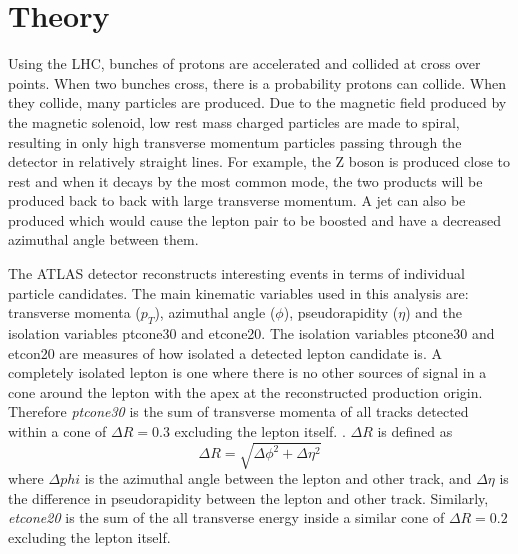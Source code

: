 \documentclass[%
 reprint,
 amsmath,amssymb,
 aps,
]{revtex4-2}
\begin{document}

\section{Theory}
Using the LHC, bunches of protons are accelerated and collided at cross over points. When two bunches cross, there is a probability protons can collide.  When they collide, many particles are produced. Due to the magnetic field produced by the magnetic solenoid, low rest mass charged particles are made to spiral, resulting in only high transverse momentum particles passing through the detector in relatively straight lines.  For example, the Z boson is produced close to rest and when it decays by the most common mode, the two products will be produced back to back with large transverse momentum. A jet can also be produced which would cause the lepton pair to be boosted and have a decreased azimuthal angle between them.

The ATLAS detector reconstructs interesting events in terms of individual particle candidates.  The main kinematic variables used in this analysis are: transverse momenta ($p_T$), azimuthal angle ($\phi$), pseudorapidity ($\eta$) and the isolation variables ptcone30 and etcone20. The isolation variables ptcone30 and etcon20 are measures of how isolated a detected lepton candidate is. A completely isolated lepton is one where there is no other sources of signal in a cone around the lepton with the apex at the reconstructed production origin.  Therefore \textit{ptcone30} is the sum of transverse momenta of all tracks detected within a cone of  $\Delta R = 0.3$ excluding the lepton itself. \cite{opendata-atlas}. $\Delta R$ is defined as 
\begin{equation}
    \Delta R = \sqrt{\Delta \phi^2 + \Delta \eta^2}
\end{equation}
where $\Delta phi$ is the azimuthal angle between the lepton and other track, and $\Delta \eta$ is the difference in pseudorapidity between the lepton and other track.
Similarly, \textit{etcone20} is the sum of the all transverse energy inside a similar cone of $\Delta R = 0.2$ excluding the lepton itself.
\end{document}
